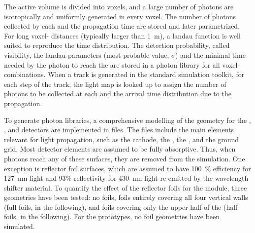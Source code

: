 The active volume is divided into voxels, and a large number of photons are isotropically and uniformly generated in every voxel. The number of photons collected by each  and the propagation time are stored and later parametrized. For long voxel- distances (typically larger than \SI{1}{\m}), a landau function is well suited to reproduce the time distribution. The detection probability, called visibility, the landau parameters (most probable value, $\sigma$) and the minimal time needed by the photon to reach the  are stored in a photon library for all voxel- combinations. When a track is generated in the standard \dual {} simulation toolkit, for each step of the track, the light map is looked up to assign the number of photons to be collected at each  and the arrival time distribution due to the propagation. 

To generate photon libraries, a comprehensive modelling of the geometry for the , , and   detectors are implemented in  files. The  files include the main elements relevant for light propagation, such as the cathode, the , the , and the ground grid. Most detector elements are assumed to be fully absorptive. Thus, when photons reach any of these surfaces, they are removed from the simulation. One exception is  reflector foil surfaces, which are assumed to have \SI{100}{\%}  efficiency for \SI{127}{\nm}  light and 93\% reflectivity for \SI{430}{\nm} light re-emitted by the wavelength shifter material. To quantify the effect of the  reflector foils for the   module, three geometries have been tested: no foils, foils entirely covering all four  vertical walls (full foils, in the following), and foils covering only the upper half of the  (half foils, in the following). For the  prototypes, no foil geometries have been simulated.

